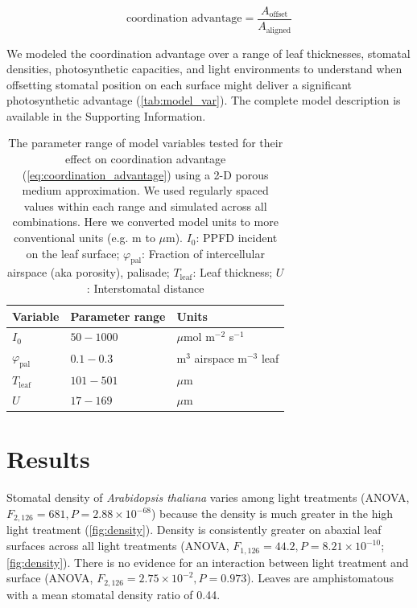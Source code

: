 \documentclass[webpdf,large,modern,unnumsec,namedate]{oup-authoring-template}
\begin{document}
\begin{equation} \label{eq:coordination_advantage}
  \text{coordination advantage} = \frac{A_\text{offset}}{A_\text{aligned}}
\end{equation}

We modeled the coordination advantage over a range of leaf thicknesses,
stomatal densities, photosynthetic capacities, and light environments to
understand when offsetting stomatal position on each surface might
deliver a significant photosynthetic advantage
(\autoref{tab:model_var}). The complete model description is available
in the Supporting Information.

\begin{table}

\caption{\label{tab:model_var}The parameter range of model variables tested for their effect on coordination advantage (\autoref{eq:coordination_advantage}) using a 2-D porous medium approximation. We used regularly spaced values within each range and simulated across all combinations. Here we converted model units to more conventional units (e.g. m to $\mu$m). $I_0$: PPFD incident on the leaf surface; $\varphi_\text{pal}$: Fraction of intercellular airspace (aka porosity), palisade; $T_\text{leaf}$: Leaf thickness; $U$: Interstomatal distance}
\centering
\begin{tabular}[t]{lll}
\toprule
Variable & Parameter range & Units\\
\midrule
$I_0$ & $50-1000$ & $\mu$mol m$^{-2}$ s$^{-1}$\\
$\varphi_\text{pal}$ & $0.1-0.3$ & m$^3$ airspace m$^{-3}$ leaf\\
$T_\text{leaf}$ & $101-501$ & $\mu$m\\
$U$ & $17-169$ & $\mu$m\\
\bottomrule
\end{tabular}
\end{table}

\section{Results}\label{results}

Stomatal density of \emph{Arabidopsis thaliana} varies among light
treatments (ANOVA, \(F_{2,126} = 681, P = 2.88 \times 10^{-68}\))
because the density is much greater in the high light treatment
(\autoref{fig:density}). Density is consistently greater on abaxial leaf
surfaces across all light treatments (ANOVA,
\(F_{1,126} = 44.2, P = 8.21 \times 10^{-10}\); \autoref{fig:density}).
There is no evidence for an interaction between light treatment and
surface (ANOVA, \(F_{2,126} = 2.75 \times 10^{-2}, P = 0.973\)). Leaves
are amphistomatous with a mean stomatal density ratio of 0.44.
\end{document}
